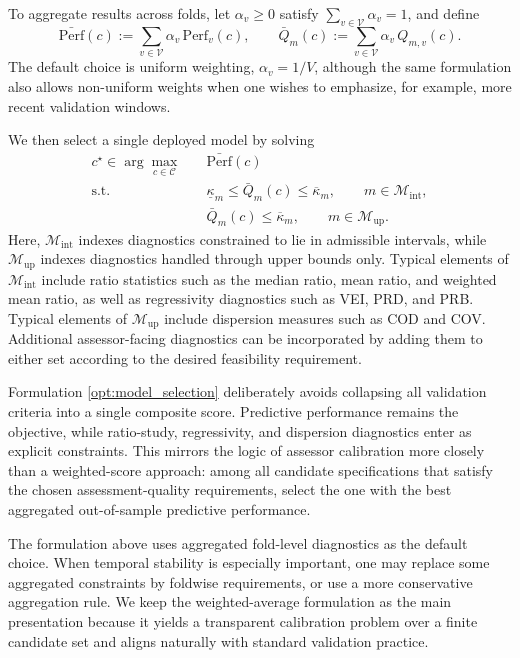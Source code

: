 \documentclass[12pt, draft]{article}
\theoremstyle{plain}
\theoremstyle{definition}
\newcommand{\1}{\mathbf{1}}
\begin{document}
To aggregate results across folds, let $\alpha_v\ge 0$ satisfy $\sum_{v\in\mathcal V}\alpha_v=1$, and define
\[
\bar{\mathrm{Perf}}(c):=\sum_{v\in\mathcal V}\alpha_v\,\mathrm{Perf}_v(c),
\qquad
\bar Q_m(c):=\sum_{v\in\mathcal V}\alpha_v\,Q_{m,v}(c).
\]
The default choice is uniform weighting, $\alpha_v=1/V$, although the same formulation also allows non-uniform weights when one wishes to emphasize, for example, more recent validation windows.

We then select a single deployed model by solving
\begin{align}
    \label{opt:model_selection}
    c^\star
    \in
    \arg\max_{c\in\mathcal C}
    \quad
    & \bar{\mathrm{Perf}}(c)
    \\
    \text{s.t.}\quad
    & \underline{\kappa}_m \le \bar Q_m(c) \le \overline{\kappa}_m,
    \qquad m\in\mathcal M_{\mathrm{int}},
    \nonumber\\
    & \bar Q_m(c) \le \overline{\kappa}_m,
    \qquad m\in\mathcal M_{\mathrm{up}}.
    \nonumber
\end{align}
Here, $\mathcal M_{\mathrm{int}}$ indexes diagnostics constrained to lie in admissible intervals, while $\mathcal M_{\mathrm{up}}$ indexes diagnostics handled through upper bounds only. Typical elements of $\mathcal M_{\mathrm{int}}$ include ratio statistics such as the median ratio, mean ratio, and weighted mean ratio, as well as regressivity diagnostics such as VEI, PRD, and PRB. Typical elements of $\mathcal M_{\mathrm{up}}$ include dispersion measures such as COD and COV. Additional assessor-facing diagnostics can be incorporated by adding them to either set according to the desired feasibility requirement.

Formulation \eqref{opt:model_selection} deliberately avoids collapsing all validation criteria into a single composite score. Predictive performance remains the objective, while ratio-study, regressivity, and dispersion diagnostics enter as explicit constraints. This mirrors the logic of assessor calibration more closely than a weighted-score approach: among all candidate specifications that satisfy the chosen assessment-quality requirements, select the one with the best aggregated out-of-sample predictive performance.

The formulation above uses aggregated fold-level diagnostics as the default choice. When temporal stability is especially important, one may replace some aggregated constraints by foldwise requirements, or use a more conservative aggregation rule. We keep the weighted-average formulation as the main presentation because it yields a transparent calibration problem over a finite candidate set and aligns naturally with standard validation practice.
\end{document}
